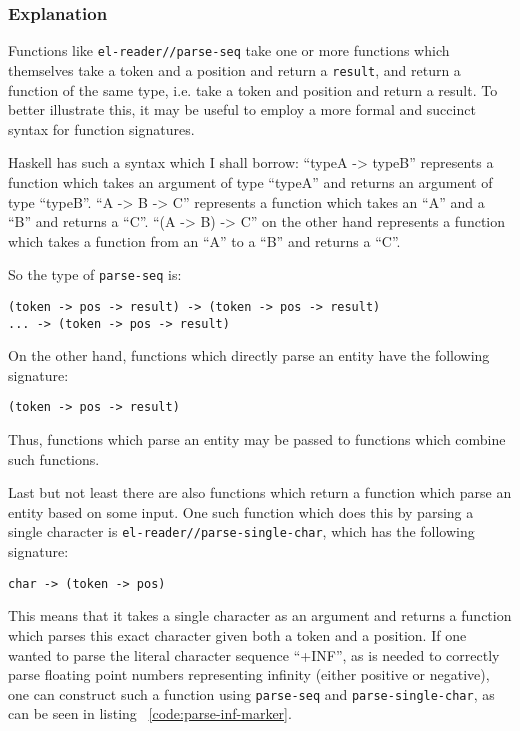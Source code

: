 \documentclass[a4paper,10pt,twoside]{report}
\newcommand{\sym}[1]{\texttt{#1}}
\newcommand{\fun}[1]{\texttt{#1}}
\begin{document}
\subsubsection{Explanation}
\label{subsubsec:parser-explanation}

Functions like \fun{el-reader//parse-seq} take one or more functions which
themselves take a token and a position and return a \sym{result}, and return a
function of the same type, i.e. take a token and position and return a result.
To better illustrate this, it may be useful to employ a more formal and succinct
syntax for function signatures.

Haskell\cite{haskell.org} has such a syntax which I shall borrow: ``typeA ->
typeB'' represents a function which takes an argument of type ``typeA'' and
returns an argument of type ``typeB''.  ``A -> B -> C'' represents a function
which takes an ``A'' and a ``B'' and returns a ``C''.  ``(A -> B) -> C'' on the
other hand represents a function which takes a function from an ``A'' to a ``B''
and returns a ``C''.

So the type of \fun{parse-seq} is:

\begin{lstlisting}[style=lispinline]
(token -> pos -> result) -> (token -> pos -> result)
... -> (token -> pos -> result)
\end{lstlisting}

On the other hand, functions which directly parse an entity have the following
signature:

\begin{lstlisting}[style=lispinline]
(token -> pos -> result)
\end{lstlisting}

Thus, functions which parse an entity may be passed to functions which combine
such functions.

Last but not least there are also functions which return a function which parse
an entity based on some input.  One such function which does this by parsing a
single character is \fun{el-reader//parse-single-char}, which has the following
signature:

\begin{lstlisting}[style=lispinline]
char -> (token -> pos)
\end{lstlisting}

This means that it takes a single character as an argument and returns a
function which parses this exact character given both a token and a position.
If one wanted to parse the literal character sequence ``+INF'', as is needed to
correctly parse floating point numbers representing infinity (either positive or
negative), one can construct such a function using \fun{parse-seq} and
\fun{parse-single-char}, as can be seen in listing ~\ref{code:parse-inf-marker}.
\end{document}
